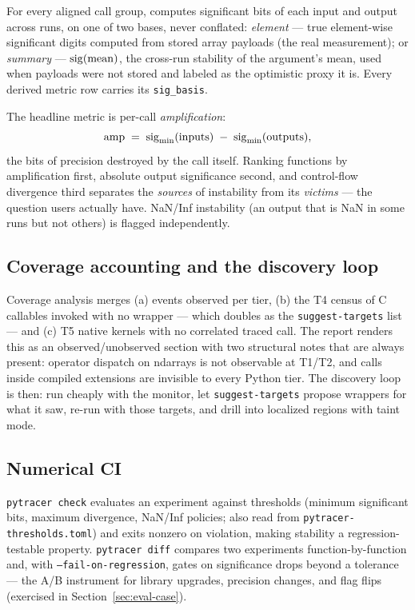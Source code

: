 For every aligned call group, \pyt{} computes significant bits of each
input and output across runs, on one of two bases, never conflated:
\emph{element} --- true element-wise significant digits computed from
stored array payloads (the real measurement); or \emph{summary} ---
$\operatorname{sig}(\mathrm{mean})$, the cross-run stability of the argument's mean,
used when payloads were not stored and labeled as the optimistic proxy it
is. Every derived metric row carries its \texttt{sig\_basis}.

The headline metric is per-call \emph{amplification}:
\begin{equation}
  \mathrm{amp} \;=\; \operatorname{sig}_{\min}(\text{inputs}) \;-\;
  \operatorname{sig}_{\min}(\text{outputs}),
  \label{eq:amp}
\end{equation}
the bits of precision destroyed by the call itself. Ranking functions by
amplification first, absolute output significance second, and
control-flow divergence third separates the \emph{sources} of instability
from its \emph{victims} --- the question users actually have. NaN/Inf
instability (an output that is NaN in some runs but not others) is
flagged independently.

\subsection{Coverage accounting and the discovery loop}
\label{sec:design-coverage}

Coverage analysis merges (a) events observed per tier, (b) the T4 census
of C callables invoked with no wrapper --- which doubles as the
\texttt{suggest-targets} list --- and (c) T5 native kernels with no
correlated traced call. The report renders this as an
observed/unobserved section with two structural notes that are always
present: operator dispatch on ndarrays is not observable at T1/T2, and
calls inside compiled extensions are invisible to every Python tier. The
discovery loop is then: run cheaply with the monitor, let
\texttt{suggest-targets} propose wrappers for what it saw, re-run with
those targets, and drill into localized regions with taint mode.

\subsection{Numerical CI}
\label{sec:design-ci}

\texttt{pytracer check} evaluates an experiment against thresholds
(minimum significant bits, maximum divergence, NaN/Inf policies; also read
from \texttt{pytracer-thresholds.toml}) and exits nonzero on violation,
making stability a regression-testable property. \texttt{pytracer diff}
compares two experiments function-by-function and, with
\texttt{--fail-on-regression}, gates on significance drops beyond a
tolerance --- the A/B instrument for library upgrades, precision changes,
and flag flips (exercised in Section~\ref{sec:eval-case}).
